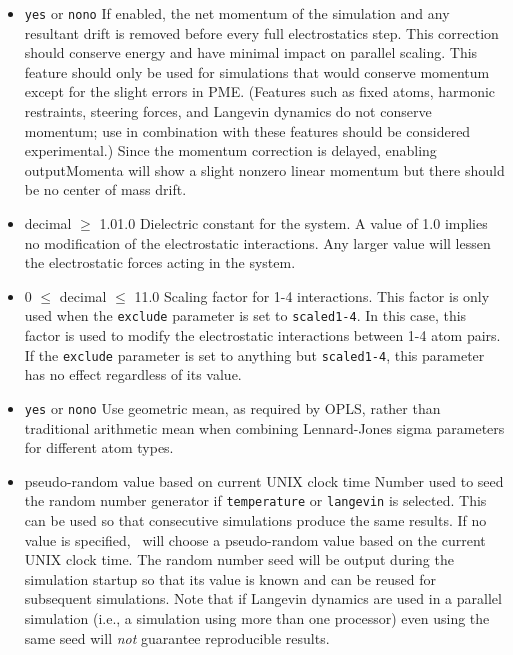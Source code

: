 \begin{itemize}
\item
{}
{{\tt yes} or {\tt no}}{{\tt no}}
{
If enabled, the net momentum of the simulation and any resultant drift
is removed before every full electrostatics step.
This correction should conserve energy and have minimal impact on
parallel scaling.
This feature should only be used for simulations that would
conserve momentum except for the slight errors in PME.
(Features such as fixed atoms, harmonic restraints, steering forces,
and Langevin dynamics do not conserve momentum; use in combination
with these features should be considered experimental.)
Since the momentum correction is delayed, enabling outputMomenta 
will show a slight nonzero linear momentum but there should be no
center of mass drift.
}

\item
{}
{decimal $\geq$ 1.0}{1.0}
{Dielectric constant for the system.  A value of 1.0 implies no modification
of the electrostatic interactions.  Any larger value will lessen the
electrostatic forces acting in the system.}

\item
{}
{0 $\leq$ decimal $\leq$ 1}{1.0}
{Scaling factor for 1-4 interactions.  This factor is only used when the
{\tt exclude} parameter is set to {\tt scaled1-4}.  In this case, this
factor is used to modify the electrostatic interactions between 1-4 atom
pairs.  If the {\tt exclude} parameter is set to anything but 
{\tt scaled1-4}, this parameter has no effect regardless of its value.}

\item
{}
{{\tt yes} or {\tt no}}{{\tt no}}
{Use geometric mean, as required by  OPLS, rather than
traditional arithmetic mean when combining Lennard-Jones sigma parameters
for different atom types.}

\item
{}
{pseudo-random value based on current UNIX clock time}
{Number used to seed the random number generator 
if {\tt temperature} or {\tt langevin} is selected.  This can be
used so that consecutive simulations produce the same results.
If no value is specified, \NAMD\ will choose a pseudo-random
value based on the current UNIX clock time.  The random number
seed will be output during the simulation startup so that
its value is known and can be reused for subsequent simulations.
Note that if Langevin dynamics are used in a parallel simulation 
(i.e., a simulation using more than one processor) 
even using the same seed will {\it not} guarantee reproducible results.
}


\end{itemize}
